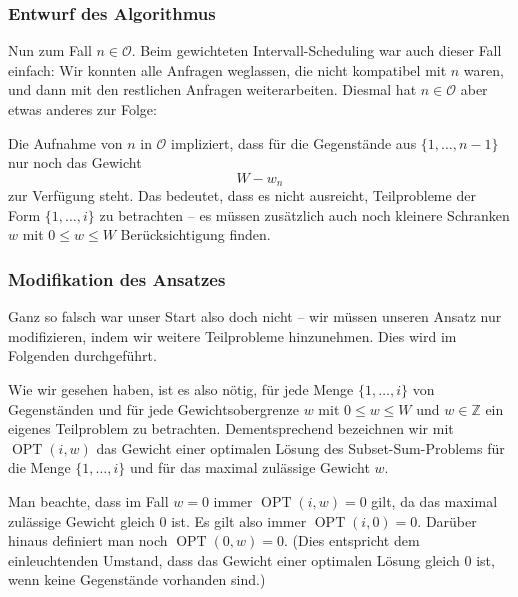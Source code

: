 \documentclass[smaller]{beamer}
\renewcommand{\O}{\mathcal{O}}
\DeclareMathOperator{\opt}{OPT}
\newcommand{\Z}{\mathbb{Z}}
\begin{document}
\begin{frame}
 \frametitle{Entwurf des Algorithmus}
 Nun zum Fall $n \in \O$. Beim gewichteten Intervall-Scheduling war auch dieser Fall einfach: Wir konnten alle Anfragen weglassen, die nicht kompatibel mit $n$ waren, und dann mit den restlichen Anfragen weiterarbeiten. \alert{Diesmal hat $n \in \O$ aber etwas anderes zur Folge}: \\ \medskip
 
 Die Aufnahme von $n$ in $\O$ impliziert, dass für die Gegenstände aus $\{ 1,\ldots,n-1 \}$ nur noch das Gewicht
\[
W-w_n
\]
zur Verfügung steht. Das bedeutet, dass es nicht ausreicht, Teilprobleme der Form $\{ 1,\ldots,i \}$ zu betrachten -- \alert{es müssen zusätzlich auch noch kleinere Schranken $w$ mit $0 \leq w \leq W$ Berücksichtigung finden.}
\end{frame}

\begin{frame}
 \frametitle{Modifikation des Ansatzes}
 \alert{Ganz so falsch war unser Start also doch nicht -- wir müssen unseren Ansatz nur modifizieren, indem wir weitere Teilprobleme hinzunehmen}. Dies wird im Folgenden durchgeführt. \\ \medskip

Wie wir gesehen haben, ist es also nötig, für jede Menge $\bigl\{ 1,\ldots,i \bigr\}$ von Gegenständen und für jede Gewichtsobergrenze $w$ mit $0 \leq w \leq W$ und $w \in \Z$ ein eigenes Teilproblem zu betrachten. Dementsprechend bezeichnen wir mit $\opt{(i,w)}$ das Gewicht einer optimalen Lösung des Subset-Sum-Problems für die Menge $\bigl\{ 1,\ldots,i \bigr\}$ und für das maximal zulässige Gewicht $w$. \\ \medskip

Man beachte, dass im Fall $w=0$ immer $\opt{(i,w)}=0$ gilt, da das maximal zulässige Gewicht gleich $0$ ist. Es gilt also immer $\opt{(i,0)}=0$. Darüber hinaus definiert man noch $\opt{(0,w)}=0$. (Dies entspricht dem einleuchtenden Umstand, dass das Gewicht einer optimalen Lösung gleich 0 ist, wenn keine Gegenstände vorhanden sind.)
\end{frame}
\end{document}
